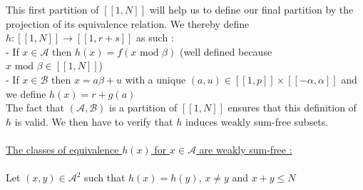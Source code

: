 This first partition of $[\![1,N]\!]$ will help us to define our final partition by the projection of its equivalence relation. We thereby define $h : [\![1,N]\!] \longrightarrow [\![1,r+s]\!]$ as such :\\
- If $x \in \mathcal{A}$ then $h(x) = f(x \text{ mod } \beta)$ (well defined because $x \text{ mod } \beta \in [\![1,N]\!]$)\\
- If $x \in \mathcal{B}$ then $x = a\beta + u$ with a unique $(a,u) \in [\![1,p]\!] \times [\![-\alpha,\alpha]\!]$ and we define $h(x) = r + g(a)$\\
The fact that $(\mathcal{A}, \mathcal{B})$ is a partition of $[\![1,N]\!]$ ensures that this definition of $h$ is valid. We then have to verify that $h$ induces weakly sum-free subsets.\\
\\
\underline{The classes of equivalence $h(x)$ for $x \in \mathcal{A}$ are weakly sum-free :}
\\
\\
Let $(x,y) \in \mathcal{A}^2$ such that $h(x) = h(y)$, $x \neq y$ and $x + y \leqslant N$
